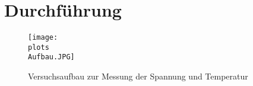 \section{Durchführung}
\label{sec:Durchführung}
\begin{figure}
  \texttt{[image: \\plots\\Aufbau.JPG]}
  \caption{Versuchsaufbau zur Messung der Spannung und Temperatur}
  \label{fig:aufbau}
\end{figure}
